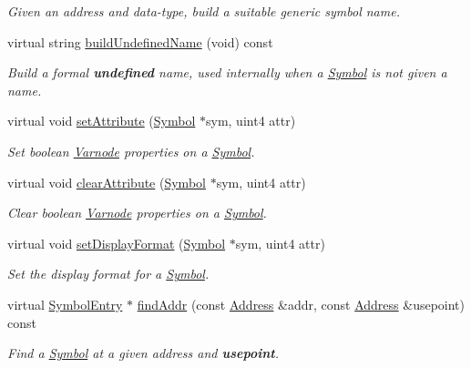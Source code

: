 \begin{DoxyCompactItemize}
\begin{DoxyCompactList}\small\item\em Given an address and data-\/type, build a suitable generic symbol name. \end{DoxyCompactList}\item 
virtual string \mbox{\hyperlink{class_scope_ghidra_a25f55a3495b08a4caafaaeb5c1cf8bed}{build\+Undefined\+Name}} (void) const
\begin{DoxyCompactList}\small\item\em Build a formal {\bfseries{undefined}} name, used internally when a \mbox{\hyperlink{class_symbol}{Symbol}} is not given a name. \end{DoxyCompactList}\item 
virtual void \mbox{\hyperlink{class_scope_ghidra_a8de7736cd5930af6bdcd29b4673ab037}{set\+Attribute}} (\mbox{\hyperlink{class_symbol}{Symbol}} $\ast$sym, uint4 attr)
\begin{DoxyCompactList}\small\item\em Set boolean \mbox{\hyperlink{class_varnode}{Varnode}} properties on a \mbox{\hyperlink{class_symbol}{Symbol}}. \end{DoxyCompactList}\item 
virtual void \mbox{\hyperlink{class_scope_ghidra_a82f1b5f561b339b03471d39349d108dd}{clear\+Attribute}} (\mbox{\hyperlink{class_symbol}{Symbol}} $\ast$sym, uint4 attr)
\begin{DoxyCompactList}\small\item\em Clear boolean \mbox{\hyperlink{class_varnode}{Varnode}} properties on a \mbox{\hyperlink{class_symbol}{Symbol}}. \end{DoxyCompactList}\item 
virtual void \mbox{\hyperlink{class_scope_ghidra_ae74dd0dfc3b70347a2ed19688adfd155}{set\+Display\+Format}} (\mbox{\hyperlink{class_symbol}{Symbol}} $\ast$sym, uint4 attr)
\begin{DoxyCompactList}\small\item\em Set the display format for a \mbox{\hyperlink{class_symbol}{Symbol}}. \end{DoxyCompactList}\item 
virtual \mbox{\hyperlink{class_symbol_entry}{Symbol\+Entry}} $\ast$ \mbox{\hyperlink{class_scope_ghidra_a444989f8c48787af5df27c2a8b234fd3}{find\+Addr}} (const \mbox{\hyperlink{class_address}{Address}} \&addr, const \mbox{\hyperlink{class_address}{Address}} \&usepoint) const
\begin{DoxyCompactList}\small\item\em Find a \mbox{\hyperlink{class_symbol}{Symbol}} at a given address and {\bfseries{usepoint}}. \end{DoxyCompactList}\item 

\end{DoxyCompactItemize}
